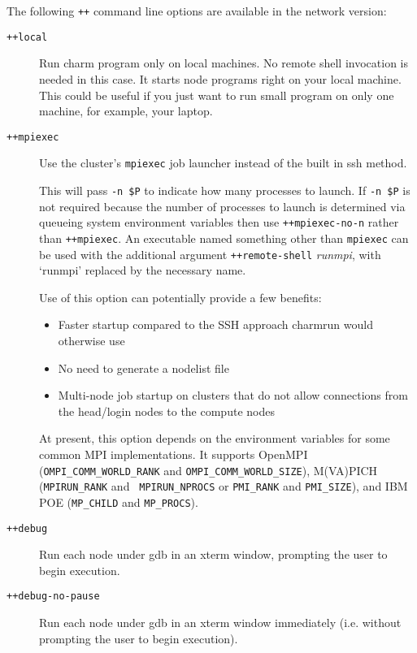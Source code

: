 The following {\tt ++} command line options are available in
the network version:
\begin{description}

\item[{\tt ++local}] Run charm program only on local machines. No
 remote shell invocation is needed in this case. It starts node programs
 right on your local machine. This could be useful if you just want to
 run small program on only one machine, for example, your laptop.


\item[{\tt ++mpiexec}]
\label{mpiexec}
Use the cluster's {\tt mpiexec} job launcher instead of the built in ssh
method.

This will pass {\tt -n \$P} to indicate how many processes to
launch.
If {\tt -n \$P} is not required because the number of processes
to launch is determined via queueing system environment variables
then use {\tt ++mpiexec-no-n} rather than {\tt ++mpiexec}.
An executable named something other than {\tt mpiexec} can be
used with the additional argument {\tt ++remote-shell} {\it runmpi},
with `runmpi' replaced by the necessary name.

Use of this option can potentially provide a few benefits:

\begin{itemize}
\item Faster startup compared to the SSH approach charmrun would
  otherwise use
\item No need to generate a nodelist file
\item Multi-node job startup on clusters that do not allow connections
  from the head/login nodes to the compute nodes
\end{itemize}

At present, this option depends on the environment variables for some
common MPI implementations. It supports OpenMPI ({\tt OMPI\_COMM\_WORLD\_RANK} and
{\tt OMPI\_COMM\_WORLD\_SIZE}), M(VA)PICH ({\tt MPIRUN\_RANK} and {\tt
  MPIRUN\_NPROCS} or {\tt PMI\_RANK} and {\tt PMI\_SIZE}),
and IBM POE ({\tt MP\_CHILD} and {\tt MP\_PROCS}).

\item[{\tt ++debug}] Run each node under gdb in an xterm window, prompting
the user to begin execution.

\item[{\tt ++debug-no-pause}] Run each node under gdb in an xterm window
immediately (i.e. without prompting the user to begin execution).


\end{description}
